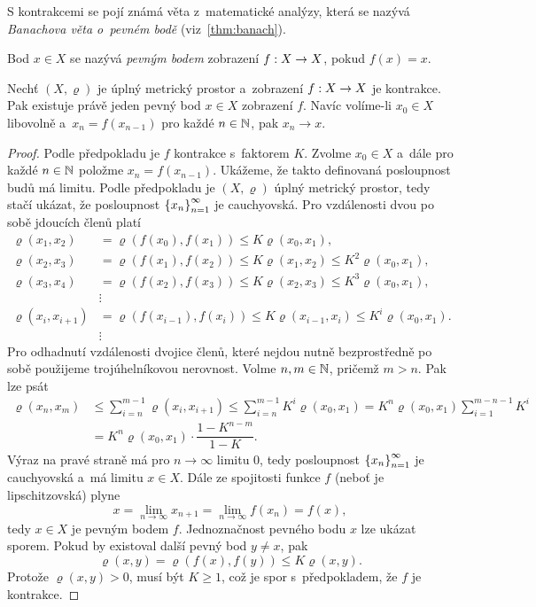 S kontrakcemi se pojí známá věta z~matematické analýzy, která se nazývá \emph{Banachova věta o~pevném bodě} (viz~\ref{thm:banach}).
\begin{definition}\label{def:pevny-bod}
    Bod $x\in X$ se nazývá \emph{pevným bodem} zobrazení $f:X \rightarrow X$, pokud $f(x)=x$.
\end{definition}
\begin{theorem}\label{thm:banach}
    Nechť $(X,\varrho)$ je úplný metrický prostor a~zobrazení $f:X \rightarrow X$ je kontrakce. Pak existuje právě jeden pevný bod $x\in X$ zobrazení $f$. Navíc volíme-li $x_0\in X$ libovolně a~$x_n=f(x_{n-1})$ pro každé $n\in\mathbb{N}$, pak $x_n\to x$.
\end{theorem}
\begin{proof}
    Podle předpokladu je $f$ kontrakce s~faktorem $K$. Zvolme $x_0\in X$ a~dále pro každé $n\in\mathbb{N}$ položme $x_n=f(x_{n-1})$. Ukážeme, že takto definovaná posloupnost budů má limitu. Podle předpokladu je $(X,\varrho)$ úplný metrický prostor, tedy stačí ukázat, že posloupnost $\left\{x_n\right\}_{n=1}^\infty$ je cauchyovská. Pro vzdálenosti dvou po sobě jdoucích členů platí
    \begin{align*}
        \varrho(x_1,x_2)&=\varrho(f(x_0),f(x_1))\leqslant K\varrho(x_0,x_1),\\
        \varrho(x_2,x_3)&=\varrho(f(x_1),f(x_2))\leqslant K\varrho(x_1,x_2)\leqslant K^2\varrho(x_0,x_1),\\
        \varrho(x_3,x_4)&=\varrho(f(x_2),f(x_3))\leqslant K\varrho(x_2,x_3)\leqslant K^3\varrho(x_0,x_1),\\
        &\vdots\\
        \varrho(x_i,x_{i+1})&=\varrho(f(x_{i-1}),f(x_i))\leqslant K\varrho(x_{i-1},x_i)\leqslant K^i\varrho(x_0,x_1).\\
        &\vdots
    \end{align*}
    Pro odhadnutí vzdálenosti dvojice členů, které nejdou nutně bezprostředně po sobě použijeme trojúhelníkovou nerovnost. Volme $n,m\in\mathbb{N}$, pričemž $m>n$. Pak lze psát
    \begin{align*}
        \varrho(x_n,x_m)&\leqslant\sum_{i=n}^{m-1}\varrho(x_i,x_{i+1})\leqslant\sum_{i=n}^{m-1}K^i\varrho(x_0,x_1)=K^n\varrho(x_0,x_1)\sum_{i=1}^{m-n-1}K^i\\
        &=K^n\varrho(x_0,x_1)\cdot\dfrac{1-K^{n-m}}{1-K}.
    \end{align*}
    Výraz na pravé straně má pro $n\to\infty$ limitu $0$, tedy posloupnost $\left\{x_n\right\}_{n=1}^\infty$ je cauchyovská a~má limitu $x\in X$. Dále ze spojitosti funkce $f$ (neboť je lipschitzovská) plyne
    \[x=\lim_{n\to\infty}x_{n+1}=\lim_{n\to\infty}f(x_n)=f(x),\]
    tedy $x\in X$ je pevným bodem $f$. Jednoznačnost pevného bodu $x$ lze ukázat sporem. Pokud by existoval další pevný bod $y\neq x$, pak
    \[\varrho(x,y)=\varrho(f(x),f(y))\leqslant K\varrho(x,y).\]
    Protože $\varrho(x,y)>0$, musí být $K\geqslant 1$, což je spor s~předpokladem, že $f$ je kontrakce.
\end{proof}
